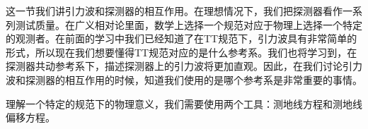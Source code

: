 
\begin{issues}
\issueNeedCite
\issueMissDepend
\end{issues}

这一节我们讲引力波和探测器的相互作用。在理想情况下，我们把探测器看作一系列测试质量。在广义相对论里面，数学上选择一个规范对应于物理上选择一个特定的观测者。在前面的学习中我们已经知道了在TT规范下，引力波具有非常简单的形式，所以现在我们想要懂得TT规范对应的是什么参考系。我们也将学习到，在探测器共动参考系下，描述探测器上的引力波将更加直观。因此，在我们讨论引力波和探测器的相互作用的时候，知道我们使用的是哪个参考系是非常重要的事情。

理解一个特定的规范下的物理意义，我们需要使用两个工具：测地线方程和测地线偏移方程。

